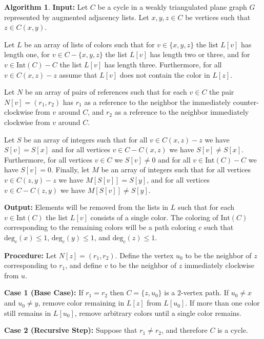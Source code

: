 \documentclass[12pt,letterpaper]{article}
\theoremstyle{plain}
\theoremstyle{definition}
\theoremstyle{break}
\newtheorem{algorithm}[lemma]{Algorithm}     %
\begin{document}
\begin{algorithm}\label{A:hartman_impl}
    \textbf{Input:} Let $C$ be a cycle in a weakly triangulated plane graph $G$
    represented by augmented adjacency lists. Let $x,y,z\in C$ be
    vertices such that $z\in C(x,y)$.

    Let $L$ be an array of lists of colors
    such that for $v\in\{x,y,z\}$ the list $L[v]$ has length one,
    for $v\in C-\{x,y,z\}$ the list $L[v]$ has length two
    or three, and for $v\in \text{Int}(C)-C$ the list
    $L[v]$ has length three. Furthermore, for all $v\in C(x,z) - z$ assume
    that $L[v]$ does not contain the color in $L[z]$.

    Let $N$ be an array of pairs of
    references such that for each $v\in C$ the pair $N[v]=(r_1,r_2)$ has
    $r_1$ as a reference to the neighbor the immediately counter-clockwise
    from $v$
    around $C$, and $r_2$ as a reference
    to the neighbor immediately clockwise from $v$ around $C$.

    Let $S$ be an array of
    integers such that for all $v\in C(x,z)-z$ we have $S[v]=S[x]$ and for
    all vertices $v\in C-C(x,z)$ we have $S[v]\ne S[x]$. Furthermore, for all
    vertices $v\in C$ we $S[v]\ne 0$ and for all $v\in \text{Int}(C)-C$
    we have $S[v]=0$. Finally, let $M$
    be an array of integers such that for all vertices $v\in C(z,y)-z$ we have
    $M[S[v]]=S[y]$, and for all vertices $v\in C-C(z,y)$ we have $M[S[v]]\ne
    S[y]$.

    \textbf{Output:} Elements will be removed from the lists in $L$ such that
    for each $v\in\text{Int}(C)$ the list $L[v]$ consists of a single color. The
    coloring of $\text{Int}(C)$ corresponding to the remaining
    colors will be a path
    coloring $c$ such that $\text{deg}_c(x)\le1$, $\text{deg}_c(y)\le1$,
    and $\text{deg}_c(z)\le1$.

    \textbf{Procedure:} Let $N[z]=(r_1,r_2)$. Define the vertex $u_0$ to be
    the neighbor of $z$ corresponding to $r_1$, and define $v$ to be the
    neighbor of $z$ immediately clockwise from $u$.
    
    \textbf{Case 1 (Base Case):} If $r_1=r_2$ then $C=\{z,u_0\}$
    is a $2$-vertex path. If $u_0\ne x$ and $u_0\ne y$, remove color
    remaining in $L[z]$ from $L[u_0]$. If more than one color still remains in
    $L[u_0]$, remove arbitrary colors until a single color remains.

    \textbf{Case 2 (Recursive Step):} Suppose that $r_1\ne r_2$, and therefore $C$ is a cycle.


\end{algorithm}
\end{document}
